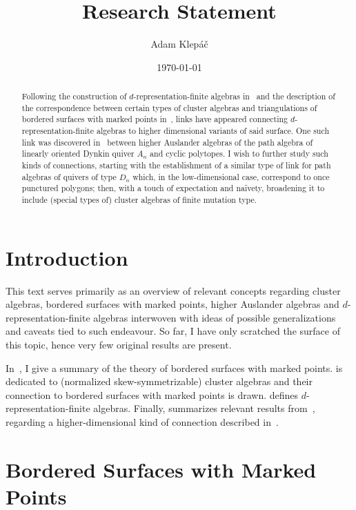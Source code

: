 \documentclass[a4paper,oneside,svgnames,draft]{amsart}
\title{Research Statement}
\author{Adam Klepáč}
\date{\today}
\theoremstyle{plain}
\theoremstyle{definition}
\begin{document}
 \maketitle
 \begin{abstract}
  Following the construction of $d$-representation-finite algebras
  in~\cite{iyama} and the description of the correspondence between certain
  types of cluster algebras and triangulations of bordered surfaces with marked
  points in~\cite{fst}, links have appeared connecting $d$-representation-finite
  algebras to higher dimensional variants of said surface. One such link was
  discovered in~\cite{ot} between higher Auslander algebras of the path algebra
  of linearly oriented Dynkin quiver $A_n$ and cyclic polytopes. I wish to
  further study such kinds of connections, starting with the establishment of a
  similar type of link for path algebras of quivers of type $D_n$ which, in the
  low-dimensional case, correspond to once punctured polygons; then, with a
  touch of expectation and naïvety, broadening it to include (special types of)
  cluster algebras of finite mutation type.
 \end{abstract}

 \section{Introduction}
 \label{sec:introduction}

 This text serves primarily as an overview of relevant concepts regarding
 cluster algebras, bordered surfaces with marked points, higher Auslander
 algebras and $d$-representation-finite algebras interwoven with ideas of
 possible generalizations and caveats tied to such endeavour. So far, I have
 only scratched the surface of this topic, hence very few original results are
 present.

 In~, I give a summary of the
 theory of bordered surfaces with marked points.  is
 dedicated to (normalized skew-symmetrizable) cluster algebras and their
 connection to bordered surfaces with marked points is drawn.
  defines $d$-representation-finite algebras.
 Finally, 
 summarizes relevant results from~\cite{ot}, regarding a higher-dimensional kind
 of connection described in~.

 \section{Bordered Surfaces with Marked Points}
 \label{sec:bordered-surfaces-with-marked-points}
\end{document}

